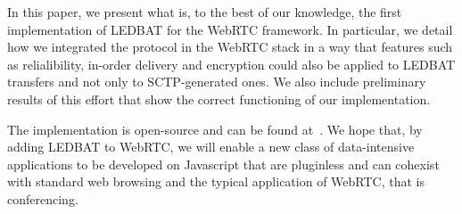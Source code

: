 \documentclass{sig-alternate}
\begin{document}
In this paper, we present what is, to the best of our knowledge, the first implementation
of LEDBAT for the WebRTC framework. In particular, we detail how we integrated the
protocol in the WebRTC stack in a way that features such as relialibility, in-order
delivery and encryption could also be applied to LEDBAT transfers and not only to
SCTP-generated ones. We also include preliminary results of this effort that show the
correct functioning of our implementation.

The implementation is open-source and can be found at~\cite{}. We hope that, by adding
LEDBAT to WebRTC, we will enable a new class of data-intensive applications to be
developed on Javascript that are pluginless and can cohexist with standard web browsing
and the typical application of WebRTC, that is conferencing.





\end{document}
